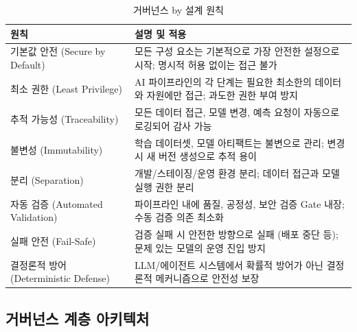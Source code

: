\begin{table}[htbp]
\centering
\caption{거버넌스 by 설계 원칙}
\label{tab:governance_by_design}
\begin{tabularx}{\textwidth}{p{3cm}X}
\toprule
\textbf{원칙} & \textbf{설명 및 적용} \\
\midrule
기본값 안전 (Secure by Default) & 모든 구성 요소는 기본적으로 가장 안전한 설정으로 시작; 명시적 허용 없이는 접근 불가 \\
\midrule
최소 권한 (Least Privilege) & AI 파이프라인의 각 단계는 필요한 최소한의 데이터와 자원에만 접근; 과도한 권한 부여 방지 \\
\midrule
추적 가능성 (Traceability) & 모든 데이터 접근, 모델 변경, 예측 요청이 자동으로 로깅되어 감사 가능 \\
\midrule
불변성 (Immutability) & 학습 데이터셋, 모델 아티팩트는 불변으로 관리; 변경 시 새 버전 생성으로 추적 용이 \\
\midrule
분리 (Separation) & 개발/스테이징/운영 환경 분리; 데이터 접근과 모델 실행 권한 분리 \\
\midrule
자동 검증 (Automated Validation) & 파이프라인 내에 품질, 공정성, 보안 검증 Gate 내장; 수동 검증 의존 최소화 \\
\midrule
실패 안전 (Fail-Safe) & 검증 실패 시 안전한 방향으로 실패 (배포 중단 등); 문제 있는 모델의 운영 진입 방지 \\
\midrule
결정론적 방어 (Deterministic Defense) & LLM/에이전트 시스템에서 확률적 방어가 아닌 결정론적 메커니즘으로 안전성 보장 \\
\bottomrule
\end{tabularx}
\end{table}


\subsection{거버넌스 계층 아키텍처}
\label{sec:13.2.2}

